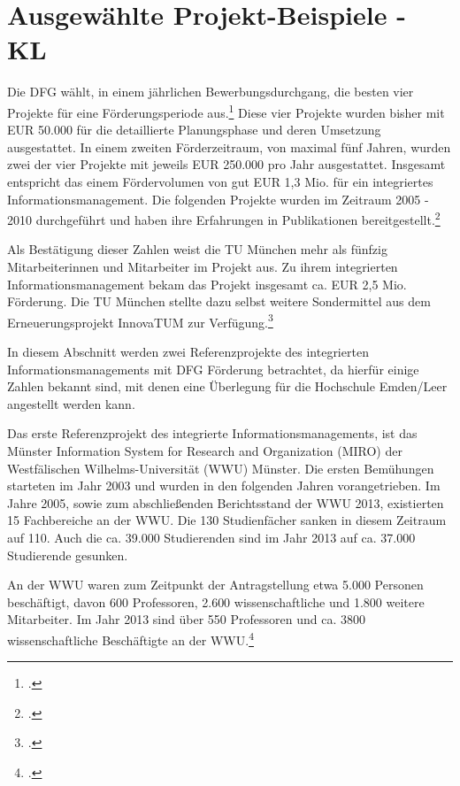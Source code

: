 
\section{Ausgewählte Projekt-Beispiele - KL}
\label{section_projekt_beispiele}
Die DFG wählt, in einem jährlichen Bewerbungsdurchgang, die besten vier Projekte für eine Förderungsperiode aus.\footcite[Für Auskünfte steht Ihnen aktuell Frau Holzer (E-Mail: Angela.Holzer@dfg.de Tel.: 0228/885-2344) Rede und Antwort,][]{dfg_42_merkblatt} Diese vier Projekte wurden bisher mit EUR 50.000 für die detaillierte Planungsphase und deren Umsetzung ausgestattet. In einem zweiten Förderzeitraum, von maximal fünf Jahren, wurden zwei der vier Projekte mit jeweils EUR 250.000 pro Jahr ausgestattet.
Insgesamt entspricht das einem Fördervolumen von gut EUR 1,3 Mio. für ein integriertes Informationsmanagement.
Die folgenden Projekte wurden im Zeitraum 2005 - 2010 durchgeführt und haben ihre Erfahrungen in Publikationen bereitgestellt.\footcite{kerres_hochschulen_2005}

Als Bestätigung dieser Zahlen weist die TU München mehr als fünfzig Mitarbeiterinnen und Mitarbeiter im Projekt aus. Zu ihrem integrierten Informationsmanagement bekam das Projekt insgesamt ca. EUR 2,5 Mio. Förderung. Die TU München stellte dazu selbst weitere Sondermittel aus dem Erneuerungsprojekt InnovaTUM zur Verfügung.\footcite{bode_informationsmanagement_2010}

In diesem Abschnitt werden zwei Referenzprojekte des integrierten Informationsmanagements mit DFG Förderung betrachtet, da hierfür einige Zahlen bekannt sind, mit denen eine Überlegung für die Hochschule Emden/Leer angestellt werden kann.

Das erste Referenzprojekt des integrierte Informationsmanagements, ist das Münster Information System for Research and Organization (MIRO) der Westfälischen Wilhelms-Universität (WWU) Münster. Die ersten Bemühungen starteten im Jahr 2003 und wurden in den folgenden Jahren vorangetrieben. Im Jahre 2005, sowie zum abschließenden Berichtsstand der WWU 2013, existierten 15 Fachbereiche an der WWU. Die 130 Studienfächer sanken in diesem Zeitraum auf 110. Auch die ca. 39.000 Studierenden sind im Jahr 2013 auf ca. 37.000 Studierende gesunken.


An der WWU waren zum Zeitpunkt der Antragstellung etwa 5.000 Personen beschäftigt, davon 600 Professoren, 2.600 wissenschaftliche und 1.800 weitere Mitarbeiter. Im Jahr 2013 sind über 550 Professoren und ca. 3800 wissenschaftliche Beschäftigte an der WWU.\footcite{vogl_bericht_2013}

